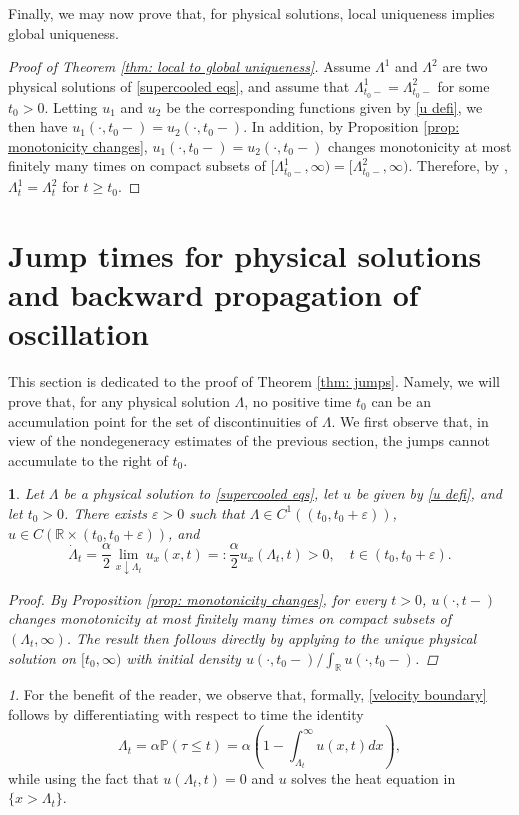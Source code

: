 \documentclass{article}
\numberwithin{equation}{section}
\numberwithin{figure}{section}
\theoremstyle{plain}
\theoremstyle{plain}
\theoremstyle{plain}
\theoremstyle{plain}
\newtheorem{lem}[thm]{\protect\lemmaname}
\theoremstyle{definition}
\theoremstyle{remark}
\newtheorem{rem}[thm]{\protect\remarkname}
\def\vep{\varepsilon}
\def\R{{\mathbb{R}}}
\def\P{{\mathbb{P}}}
\providecommand{\lemmaname}{Lemma}
\providecommand{\remarkname}{Remark}
\begin{document}
Finally, we may now prove that, for physical solutions, local uniqueness implies global uniqueness.
\begin{proof}[Proof of Theorem \ref{thm: local to global uniqueness}] Assume $\Lambda^1$ and $\Lambda^2$ are two physical solutions of \eqref{supercooled eqs}, and assume that $\Lambda^1_{t_0-}=\Lambda^2_{t_0-}$ for some $t_0>0$. Letting $u_1$ and $u_2$ be the corresponding functions given by \eqref{u defi}, we then have $u_1(\cdot,t_0-)=u_2(\cdot,t_0-)$. In addition, by Proposition \ref{prop: monotonicity changes}, $u_1(\cdot,t_0-)=u_2(\cdot,t_0-)$ changes monotonicity at most finitely many times on compact subsets of $[\Lambda^1_{t_0-},\infty)=[\Lambda^2_{t_0-},\infty)$. Therefore, by \cite[Thm. 1.1]{delarue}, $\Lambda^1_t=\Lambda^2_t$ for $t\geq t_0$.    
\end{proof}
\section{Jump times for physical solutions and backward propagation of oscillation} \label{sec: jumps}
This section is dedicated to the proof of Theorem \ref{thm: jumps}. Namely, we will prove that, for any physical solution $\Lambda$, no positive time $t_{0}$ can be an accumulation point for the set of discontinuities of $\Lambda$. We first observe that, in view of the nondegeneracy estimates of the previous section, the jumps cannot accumulate to the right of $t_0$. 
\begin{lem} \label{lem: right accum} Let $\Lambda$ be a physical solution to \eqref{supercooled eqs}, let $u$ be given by \eqref{u defi}, and let $t_0>0$. There exists $\vep>0$ such that $\Lambda\in C^{1}((t_0,t_0+\vep))$, $u \in C(\R \times (t_0,t_0+\vep))$, and
\begin{equation} \label{velocity boundary}
    \dot \Lambda_t=\frac{\alpha}{2}\lim_{x \downarrow \Lambda_t}u_x(x,t)=:\frac{\alpha}{2}u_x(\Lambda_t,t)>0, \quad t\in (t_0,t_0+\vep).
\end{equation}
\begin{proof}
 By Proposition \ref{prop: monotonicity changes}, for every $t>0$, $u(\cdot,t-)$ changes monotonicity at most finitely many times on compact subsets of $(\Lambda_t,\infty)$. The result then follows directly by applying \cite[Thm. 1.1]{delarue} to the unique physical solution on $[t_0,\infty)$ with initial density $u(\cdot,t_0-)/\int_{\R}u(\cdot,t_0-)$.
\end{proof}
\end{lem}
\begin{rem}For the benefit of the reader, we observe that, formally, \eqref{velocity boundary} follows by differentiating with respect to time the identity
\begin{equation} \label{lambda u eq}\Lambda_{t}=\alpha\P(\tau\leq t) = \alpha\left(1-\int_{\Lambda_t}^{\infty}u(x,t)dx\right),\end{equation}
while using the fact that $u(\Lambda_t,t)=0$ and $u$ solves the heat equation in $\{x>\Lambda_t\}$.    
\end{rem}
\end{document}
